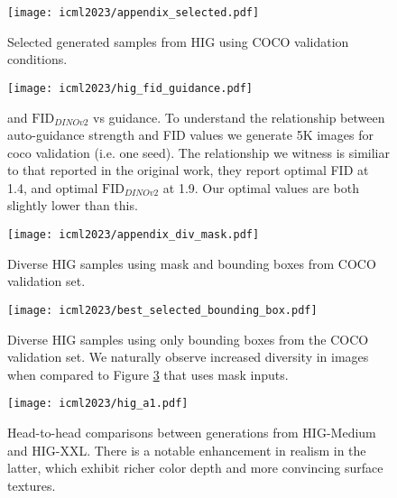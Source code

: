 \newpage

\begin{figure}
    \centering
    \texttt{[image: icml2023/appendix\_selected.pdf]}
    \caption{Selected generated samples from HIG using COCO validation conditions.}
    \label{fig:appendix_best}
\end{figure}

\begin{figure}
    \centering
    \texttt{[image: icml2023/hig\_fid\_guidance.pdf]}
    \caption{ and $\text{FID}_{\textit{DINOv2}}$ vs guidance. To understand the relationship between auto-guidance strength and FID values we generate 5K images for coco validation (i.e. one seed). The relationship we witness is similiar to that reported in the original \cite{karras_analyzing_2024} work, they report optimal FID at 1.4, and optimal $\text{FID}_{\textit{DINOv2}}$ at 1.9. Our optimal values are both slightly lower than this.}
    \label{fig:fid_appendix}
\end{figure}

\newpage

\begin{figure}
    \centering
    \texttt{[image: icml2023/appendix\_div\_mask.pdf]}
    \caption{Diverse HIG samples using mask and bounding boxes from COCO validation set.}
    \label{fig:appendix_best_diversity}
\end{figure}

\newpage

\begin{figure}
    \centering
    \texttt{[image: icml2023/best\_selected\_bounding\_box.pdf]}
    \caption{Diverse HIG samples using only bounding boxes from the COCO validation set. We naturally observe increased diversity in images when compared to Figure \ref{fig:appendix_best_diversity} that uses mask inputs.}
    \label{fig:appendix_best_box}
\end{figure}

\clearpage
\newpage

\begin{figure*}
    \centering
    \texttt{[image: icml2023/hig\_a1.pdf]}
    \caption{Head-to-head comparisons between generations from HIG-Medium and HIG-XXL. There is a notable enhancement in realism in the latter, which exhibit richer color depth and more convincing surface textures.}
    \label{fig:m_vs_xl_comparison}
\end{figure*}

